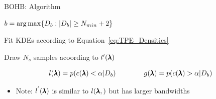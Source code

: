 \begin{frame}{BOHB: Algorithm}

\begin{center}
\begin{minipage}{0.75\textwidth}
\begin{algorithm}[H]
    \LinesNumbered
    \SetAlgoLined
    \setcounter{AlgoLine}{0}
    \DeclarePairedDelimiter\ceil{\lceil}{\rceil}
    \DeclarePairedDelimiter\floor{\lfloor}{\rfloor}
    \DeclarePairedDelimiter\abs{\lvert}{\rvert}
    
    $b=\operatorname*{arg\,max} \{D_b:\lvert D_b \rvert \geq N_{min}+2\}$
    
    
    Fit KDEs according to Equation~\ref{eq:TPE_Densities}
    
    Draw $N_s$ samples acoording to $l'(\pmb{\lambda})$
    
       
    \caption*{Pseudocode for sampling in BOHB}
\end{algorithm}
\end{minipage}
\end{center}

\pause
\begin{equation}
    l(\pmb{\lambda})=p(c({\pmb{\lambda}})<\alpha| D_b)\quad\quad\quad\quad
    g(\pmb{\lambda})=p(c({\pmb{\lambda}})>\alpha| D_b)
    \label{eq:TPE_Densities}
\end{equation}

\pause
\begin{itemize}
	\item Note: $l^{'}(\pmb{\lambda})$ is similar to $l(\pmb{\lambda},)$ but has larger bandwidths
\end{itemize}

\end{frame}
